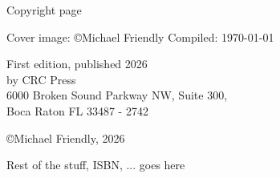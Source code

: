 
%
\cleardoublepage

\thispagestyle{empty}

{\Large Copyright page}

Cover image: \copyright Michael Friendly
Compiled: \today

First edition, published 2026 \\
by CRC Press \\
6000 Broken Sound Parkway NW, Suite 300, \\
Boca Raton FL 33487 - 2742

\copyright Michael Friendly, 2026

Rest of the stuff, ISBN, ... goes here

\cleardoublepage

% 
% 

\setlength{\abovedisplayskip}{-5pt}
\setlength{\abovedisplayshortskip}{-5pt}



